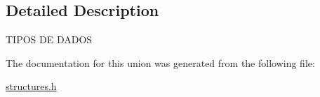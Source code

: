 \subsection{Detailed Description}


 T\+I\+P\+OS DE D\+A\+D\+OS 

The documentation for this union was generated from the following file\+:\begin{DoxyCompactItemize}
\item 
\mbox{\hyperlink{structures_8h}{structures.\+h}}\end{DoxyCompactItemize}
